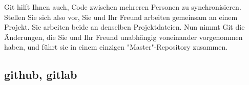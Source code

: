  
 
 Git hilft Ihnen auch, Code zwischen mehreren Personen zu synchronisieren. Stellen Sie sich also vor, Sie und Ihr Freund arbeiten gemeinsam an einem Projekt. Sie arbeiten beide an denselben Projektdateien. Nun nimmt Git die Änderungen, die Sie und Ihr Freund unabhängig voneinander vorgenommen haben, und führt sie in einem einzigen "Master"-Repository zusammen.\\
 
 
\subsection{github, gitlab}



